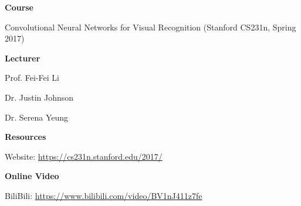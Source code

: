 \textbf{Course}

Convolutional Neural Networks for Visual Recognition (Stanford CS231n, Spring 2017)

\vspace{2ex}

\textbf{Lecturer}

Prof. Fei-Fei Li

Dr. Justin Johnson

Dr. Serena Yeung

\vspace{2ex}

\textbf{Resources}

Website: \url{https://cs231n.stanford.edu/2017/}

\vspace{2ex}

\textbf{Online Video}

BiliBili: \url{https://www.bilibili.com/video/BV1nJ411z7fe}
